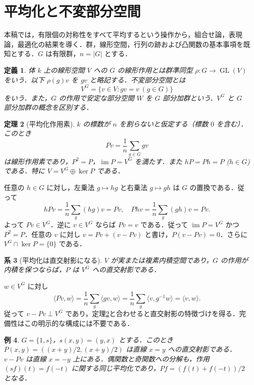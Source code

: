 \documentclass[a5paper,10pt,onecolumn]{jsarticle}
\makeatletter
\theoremstyle{mathnotetheorem}
\newtheorem{theorem}{定理}[section]
\newtheorem{definition}[theorem]{定義}
\newtheorem{corollary}[theorem]{系}
\newtheorem{example}[theorem]{例}
\renewcommand{\proofname}{証明}
\renewenvironment{proof}[1][\proofname]{%
  \par\pushQED{\qed}\normalfont\topsep4\p@\@plus2\p@\relax
  \trivlist\item[\hskip\labelsep\bfseries #1]\ignorespaces
}{\popQED\endtrivlist\@endpefalse}
\makeatother
\begin{document}
\section{平均化と不変部分空間}
本稿では，有限個の対称性をすべて平均するという操作から，組合せ論，表現論，最適化の結果を導く．群，線形空間，行列の跡および凸関数の基本事項を既知とする．$G$ は有限群，$n=|G|$ とする．

\begin{definition}
体 $k$ 上の線形空間 $V$ への $G$ の線形作用とは群準同型 $\rho:G\to\operatorname{GL}(V)$ をいう．以下 $\rho(g)v$ を $gv$ と略記する．不変部分空間とは
\[
 V^G=\{v\in V:gv=v\ (g\in G)\}
\]
をいう．また，$G$ の作用で安定な部分空間 $W$ を $G$ 部分加群という．$V^G$ と $G$ 部分加群の概念を区別する．
\end{definition}
\begin{theorem}[平均化作用素]\label{thm:average}
$k$ の標数が $n$ を割らないと仮定する（標数 $0$ を含む）．このとき
\begin{equation}\label{eq:avg}
 Pv=\frac1n\sum_{g\in G}gv
\end{equation}
は線形作用素であり，$P^2=P$，$\operatorname{im}P=V^G$ を満たす．また $hP=Ph=P$ ($h\in G$) である．特に $V=V^G\oplus\ker P$ である．
\end{theorem}
\begin{proof}
任意の $h\in G$ に対し，左乗法 $g\mapsto hg$ と右乗法 $g\mapsto gh$ は $G$ の置換である．従って
\[
 hPv=\frac1n\sum_g(hg)v=Pv,
 \quad Phv=\frac1n\sum_g(gh)v=Pv.
\]
よって $Pv\in V^G$．逆に $v\in V^G$ ならば $Pv=v$ である．従って $\operatorname{im}P=V^G$ かつ $P^2=P$．任意の $v$ に対し $v=Pv+(v-Pv)$ と書け，$P(v-Pv)=0$．さらに $V^G\cap\ker P=\{0\}$ である．
\end{proof}
\begin{corollary}[平均化は直交射影になる]\label{cor:orth}
$V$ が実または複素内積空間であり，$G$ の作用が内積を保つならば，$P$ は $V^G$ への直交射影である．
\end{corollary}
\begin{proof}
$w\in V^G$ に対し
\[
 \langle Pv,w\rangle=\frac1n\sum_g\langle gv,w\rangle
 =\frac1n\sum_g\langle v,g^{-1}w\rangle=\langle v,w\rangle.
\]
従って $v-Pv\perp V^G$ であり，定理\ref{thm:average}と合わせると直交射影の特徴づけを得る．完備性はこの明示的な構成には不要である．
\end{proof}
\begin{example}
$G=\{1,s\}$，$s(x,y)=(y,x)$ とする．このとき $P(x,y)=((x+y)/2,(x+y)/2)$ は直線 $x=y$ への直交射影である．$v-Pv$ は直線 $x=-y$ 上にある．偶関数と奇関数への分解も，作用 $(sf)(t)=f(-t)$ に関する同じ平均化であり，$Pf=(f(t)+f(-t))/2$ となる．
\end{example}
\end{document}
